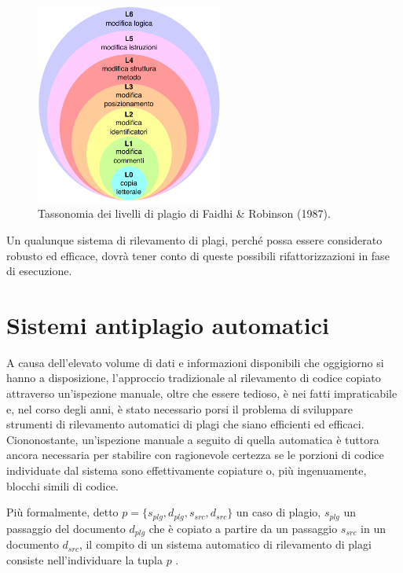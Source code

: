 \begin{figure}[h]
    \centering
    \includegraphics[width=0.55\textwidth]{resources/img/01-levels-of-plagiarism.pdf}
    \caption{Tassonomia dei livelli di plagio di Faidhi \& Robinson (1987).}
    \label{img:01-levels-of-plagiarism}
\end{figure}

Un qualunque sistema di rilevamento di plagi, perché possa essere considerato robusto ed efficace, dovrà tener conto di queste possibili rifattorizzazioni in fase di esecuzione.

\section{Sistemi antiplagio automatici}
\label{01:automatic-plagiarism-detector}
A causa dell'elevato volume di dati e informazioni disponibili che oggigiorno si hanno a disposizione, l'approccio tradizionale al rilevamento di codice copiato attraverso un'ispezione manuale, oltre che essere tedioso, è nei fatti impraticabile e, nel corso degli anni, è stato necessario porsi il problema di sviluppare strumenti di rilevamento automatici di plagi che siano efficienti ed efficaci.
%
Ciononostante, un'ispezione manuale a seguito di quella automatica è tuttora ancora necessaria per stabilire con ragionevole certezza se le porzioni di codice individuate dal sistema sono effettivamente copiature o, più ingenuamente, blocchi simili di codice.

Più formalmente, detto $p = \{s_{plg}, d_{plg}, s_{src}, d_{src}\}$ un caso di plagio, $s_{plg}$ un passaggio del documento $d_{plg}$ che è copiato a partire da un passaggio $s_{src}$ in un documento $d_{src}$, il compito di un sistema automatico di rilevamento di plagi consiste nell'individuare la tupla $p$ \cite{yalcin-et-al-2022}.

